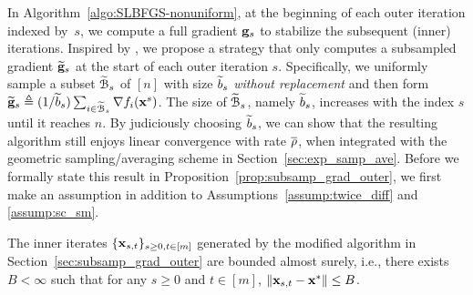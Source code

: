 \documentclass[10pt,twocolumn,journal]{IEEEtran}
\begin{document}
In Algorithm~\ref{algo:SLBFGS-nonuniform}, at the beginning of each outer iteration indexed by~$s$, we compute a full gradient $\mathbf{g}_s$ to stabilize the subsequent (inner) iterations. Inspired by \cite{Reza_15}, we propose a strategy that only computes a subsampled gradient $\widetilde{\mathbf{g}}_s$ at the start of each outer iteration $s$. %
Specifically, we uniformly sample a subset $\widetilde{\mathcal{B}}_s$ of $[n]$ with size $\widetilde{b}_s$ {\em without replacement} and then form $\widetilde{\mathbf{g}}_s\triangleq ({1}/{\widetilde{b}_s})\sum_{i\in\widetilde{\mathcal{B}}_s} \nabla f_i(\mathbf{x}^s)$. 
The size of $\widetilde{\mathcal{B}}_s$, namely $\widetilde{b}_s$, increases with the index $s$ until it reaches $n$. %
By judiciously choosing $\widetilde{b}_s$, we can show that the resulting algorithm still enjoys linear convergence with rate $\overline{\rho}$, when integrated with the geometric sampling/averaging scheme in Section~\ref{sec:exp_samp_ave}. Before we formally state this result in Proposition~\ref{prop:subsamp_grad_outer}, we first make an assumption in addition  to Assumptions~\ref{assump:twice_diff} and \ref{assump:sc_sm}.

\begin{assump}\label{assump:as_bound}
The inner iterates $\{\mathbf{x}_{s,t}\}_{s\ge 0,t\in[m]}$ generated by the modified algorithm in Section~\ref{sec:subsamp_grad_outer} are bounded almost surely, i.e., there exists $B<\infty$ such that for any $s\ge 0$ and $t\in[m]$, $\left\Vert\mathbf{x}_{s,t}-\mathbf{x}^*\right\Vert\le B$. 
\end{assump}

\end{document}
